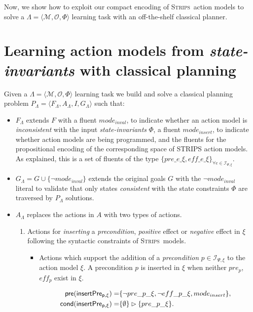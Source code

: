 \documentclass{article}
\newcommand{\tup}[1]{{\langle #1 \rangle}}
\newcommand{\pre}{\mathsf{pre}}     %
\newcommand{\cond}{\mathsf{cond}}   %
\newcommand{\strips}{\textsc{Strips}}
\begin{document}
Now, we show how to exploit our compact encoding of \strips\ action models to solve a $\Lambda=\tup{\mathcal{M},{\mathcal O},\Phi}$ learning task with an off-the-shelf classical planner.


\section{Learning action models from {\em state-invariants} with classical planning}
\label{sec:compilation}
Given a $\Lambda=\tup{\mathcal{M},{\mathcal O},\Phi}$ learning task we build and solve a classical planning problem $P_{\Lambda}=\tup{F_{\Lambda},A_{\Lambda},I,G_{\Lambda}}$ such that:
\begin{itemize}
\item $F_{\Lambda}$ extends $F$ with a fluent {\small$mode_{inval}$}, to indicate whether an action model is {\em inconsistent} with the input {\em state-invariants} $\Phi$, a fluent {\small$mode_{insert}$}, to indicate whether action models are being programmed, and the fluents for the propositional encoding of the corresponding space of STRIPS action models. As explained, this is a set of fluents of the type $\{pre\_e\_\xi, eff\_e\_\xi\}_{\forall e\in{\mathcal I}_{\Psi,\xi}}$.

\item $G_{\Lambda}= G\cup \{\neg mode_{inval}\}$ extends the original goals $G$ with the $\neg mode_{inval}$ literal to validate that only states {\em consistent} with the state constraints $\Phi$ are traversed by $P_{\Lambda}$ solutions.

\item $A_{\Lambda}$ replaces the actions in $A$ with two types of actions.
\begin{enumerate}
\item Actions for {\em inserting} a {\em precondition}, {\em positive} effect or {\em negative} effect in $\xi$ following the syntactic constraints of \strips\ models. 
\begin{itemize}
\item Actions which support the addition of a {\em precondition} $p\in {\mathcal I}_{\Psi,\xi}$ to the action model $\xi$. A precondition $p$ is inserted in $\xi$ when neither $pre_p$, $eff_p$ exist in $\xi$.

\begin{small}
\begin{align*}
\hspace*{7pt}\pre(\mathsf{insertPre_{p,\xi}})=&\{\neg pre\_p\_\xi, \neg eff\_p\_\xi, mode_{insert}\},\\
\cond(\mathsf{insertPre_{p,\xi}})=&\{\emptyset\}\rhd\{pre\_p\_\xi\}.
\end{align*}
\end{small}


\end{itemize}
\end{enumerate}
\end{itemize}
\end{document}
